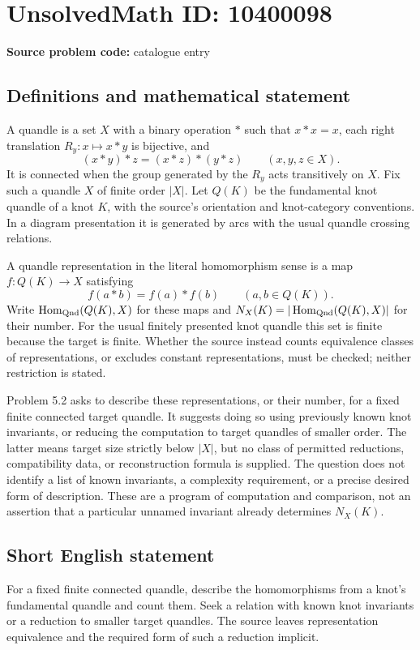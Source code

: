 \documentclass[11pt]{article}
\begin{document}
\section*{UnsolvedMath ID: 10400098}
\textbf{Source problem code:} catalogue entry
\subsection{Definitions and mathematical statement}
A quandle is a set \(X\) with a binary operation \(*\) such that \(x*x=x\), each right translation \(R_y:x\mapsto x*y\) is bijective, and
\[
 (x*y)*z=(x*z)*(y*z)\qquad(x,y,z\in X).
\]
It is connected when the group generated by the \(R_y\) acts transitively on \(X\). Fix such a quandle \(X\) of finite order \(|X|\). Let \(Q(K)\) be the fundamental knot quandle of a knot \(K\), with the source's orientation and knot-category conventions. In a diagram presentation it is generated by arcs with the usual quandle crossing relations.

A quandle representation in the literal homomorphism sense is a map \(f:Q(K)\to X\) satisfying
\[
 f(a*b)=f(a)*f(b)\qquad(a,b\in Q(K)).
\]
Write \(\operatorname{Hom}_{\rm Qnd}(Q(K),X)\) for these maps and \(N_X(K)=|\operatorname{Hom}_{\rm Qnd}(Q(K),X)|\) for their number. For the usual finitely presented knot quandle this set is finite because the target is finite. Whether the source instead counts equivalence classes of representations, or excludes constant representations, must be checked; neither restriction is stated.

Problem 5.2 asks to describe these representations, or their number, for a fixed finite connected target quandle. It suggests doing so using previously known knot invariants, or reducing the computation to target quandles of smaller order. The latter means target size strictly below \(|X|\), but no class of permitted reductions, compatibility data, or reconstruction formula is supplied. The question does not identify a list of known invariants, a complexity requirement, or a precise desired form of description. These are a program of computation and comparison, not an assertion that a particular unnamed invariant already determines \(N_X(K)\).
\subsection{Short English statement}
For a fixed finite connected quandle, describe the homomorphisms from a knot's fundamental quandle and count them. Seek a relation with known knot invariants or a reduction to smaller target quandles. The source leaves representation equivalence and the required form of such a reduction implicit.
\end{document}
